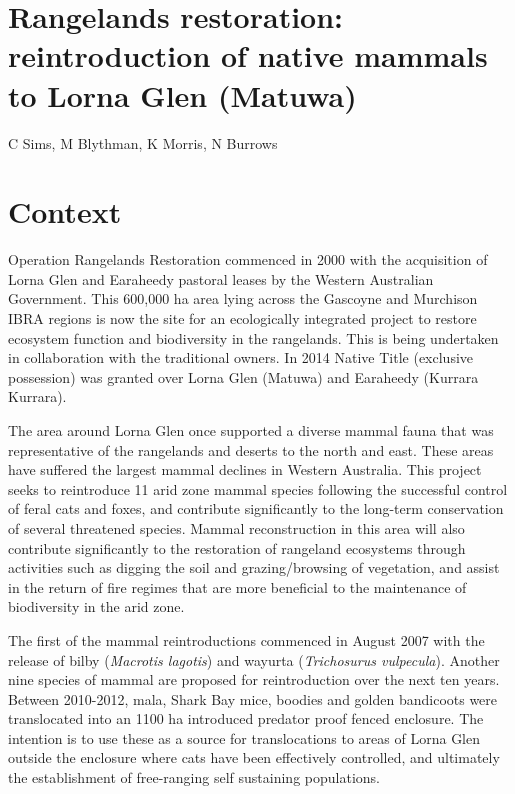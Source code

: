 \documentclass[version=last,
    paper=a4,                               %
    10pt,                                   %
    dvipsnames,
    oneside,                              %
    headings=openany,                       %
    open=any,
    BCOR=7mm,                               %
    DIV=15,     %
]{scrbook}
\begin{document}
\section*{Rangelands restoration: reintroduction of native mammals to Lorna Glen
(Matuwa)
}

C Sims, M Blythman, K Morris, N Burrows



\section*{Context}

Operation Rangelands Restoration commenced in 2000 with the acquisition
of Lorna Glen and Earaheedy pastoral leases by the Western Australian
Government. This 600,000 ha area lying across the Gascoyne and Murchison
IBRA regions is now the site for an ecologically integrated project to
restore ecosystem function and biodiversity in the rangelands. This is
being undertaken in collaboration with the traditional owners. In 2014
Native Title (exclusive possession) was granted over Lorna Glen (Matuwa)
and Earaheedy (Kurrara Kurrara).

The area around Lorna Glen once supported a diverse mammal fauna that
was representative of the rangelands and deserts to the north and east.
These areas have suffered the largest mammal declines in Western
Australia. This project seeks to reintroduce 11 arid zone mammal species
following the successful control of feral cats and foxes, and contribute
significantly to the long-term conservation of several threatened
species. Mammal reconstruction in this area will also contribute
significantly to the restoration of rangeland ecosystems through
activities such as digging the soil and grazing/browsing of vegetation,
and assist in the return of fire regimes that are more beneficial to the
maintenance of biodiversity in the arid zone.

The first of the mammal reintroductions commenced in August 2007 with
the release of bilby (\emph{Macrotis lagotis}) and wayurta
(\emph{Trichosurus vulpecula}). Another nine species of mammal are
proposed for reintroduction over the next ten years. Between 2010-2012,
mala, Shark Bay mice, boodies and golden bandicoots were translocated
into an 1100 ha introduced predator proof fenced enclosure. The
intention is to use these as a source for translocations to areas of
Lorna Glen outside the enclosure where cats have been effectively
controlled, and ultimately the establishment of free-ranging self
sustaining populations.
\end{document}
